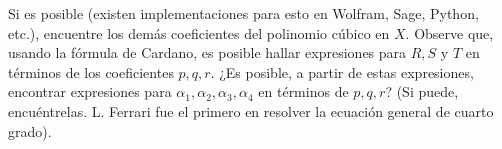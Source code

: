 

Si es posible (existen implementaciones para esto en
Wolfram, Sage, Python, etc.), encuentre los demás coeficientes
del polinomio cúbico en \( X \). Observe que, usando la fórmula de
Cardano, es posible hallar expresiones para \( R, S \) y \( T \) en términos
de los coeficientes \( p, q, r \). ¿Es posible, a partir de estas expresiones,
encontrar expresiones para \( \alpha_1, \alpha_2, \alpha_3, \alpha_4 \) en
términos de \( p, q, r \)? (Si puede, encuéntrelas. L. Ferrari fue el primero en resolver la
ecuación general de cuarto grado).
